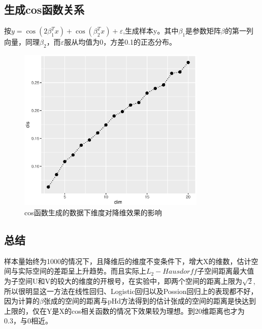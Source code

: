 \subsection{生成cos函数关系}
按$y=\cos(2\beta_1^Tx)+\cos(\beta_2^Tx)+\varepsilon$,生成样本y。其中$\beta_1$是参数矩阵$\beta$的第一列向量，同理$\beta_2$，而$\varepsilon$服从均值为0，方差0.1的正态分布。
\begin{figure}[H]
    \centering
    \includegraphics[width=0.8\textwidth]{image/cos_phd.eps}
    \caption{cos函数生成的数据下维度对降维效果的影响}
\end{figure}

\subsection{总结}
样本量始终为1000的情况下，且降维后的维度不变条件下，增大X的维数，估计空间与实际空间的差距呈上升趋势。而且实际上$L_2-Hausdorff$子空间距离最大值为子空间U和V的较大的维度的开根号，在实验中，即两个空间的距离上限为$\sqrt{2}$,所以很明显这一方法在线性回归、Logistic回归以及Possion回归上的表现都不好，因为计算的$\beta$张成的空间的距离与pHd方法得到的估计张成的空间的距离是快达到上限的，仅在Y是X的cos相关函数的情况下效果较为理想。到20维距离也才为0.3，与0相近。


